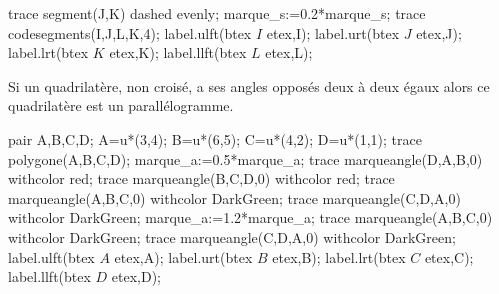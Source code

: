 \begin{changemargin}{0mm}{-15mm}
\begin{propriete}
\begin{minipage}{0.35\linewidth}
\begin{Geometrie}[CoinHD={(7u,6u)}]
                trace segment(J,K) dashed evenly;
                marque_s:=0.2*marque_s;
                trace codesegments(I,J,L,K,4);
                label.ulft(btex $I$ etex,I);
                label.urt(btex $J$ etex,J);
                label.lrt(btex $K$ etex,K);
                label.llft(btex $L$ etex,L);
            \end{Geometrie}
        \end{minipage}
    \end{propriete}
    \begin{propriete}
        \begin{minipage}{0.65\linewidth}    
            Si un quadrilatère, non croisé, a ses angles opposés deux à deux égaux alors ce quadrilatère est un parallélogramme.
        \end{minipage}
        \begin{minipage}{0.35\linewidth}    
            \begin{Geometrie}[CoinHD={(7u,6u)}]
                pair A,B,C,D;
                A=u*(3,4);
                B=u*(6,5);
                C=u*(4,2);
                D=u*(1,1);
                trace polygone(A,B,C,D);
                marque_a:=0.5*marque_a;
                trace marqueangle(D,A,B,0) withcolor red;
                trace marqueangle(B,C,D,0) withcolor red;
                trace marqueangle(A,B,C,0) withcolor DarkGreen;
                trace marqueangle(C,D,A,0) withcolor DarkGreen;
                marque_a:=1.2*marque_a;
                trace marqueangle(A,B,C,0) withcolor DarkGreen;
                trace marqueangle(C,D,A,0) withcolor DarkGreen;
                label.ulft(btex $A$ etex,A);
                label.urt(btex $B$ etex,B);
                label.lrt(btex $C$ etex,C);
                label.llft(btex $D$ etex,D);
            \end{Geometrie}
        \end{minipage}
    \end{propriete}
\end{changemargin}
 
